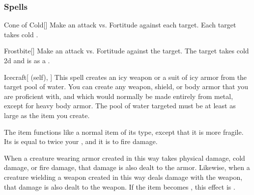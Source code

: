 \subsubsection{Spells}


\lowercase{\hypertarget{spell:Cone of Cold}{}}\label{spell:Cone of Cold}
\begin{freeability}[\nth{1}]{\hypertarget{spell:Cone of Cold}{Cone of Cold}}[]
Make an attack vs. Fortitude against each target.
\hit Each target takes cold .
\end{freeability}
\vspace{0.25em}



\lowercase{\hypertarget{spell:Frostbite}{}}\label{spell:Frostbite}
\begin{freeability}[\nth{1}]{\hypertarget{spell:Frostbite}{Frostbite}}[]
Make an attack vs. Fortitude against the target.
\hit The target takes cold  \minus2d and is  as a .
\end{freeability}
\vspace{0.25em}



\lowercase{\hypertarget{spell:Icecraft}{}}\label{spell:Icecraft}
\begin{attuneability}[\nth{1}]{\hypertarget{spell:Icecraft}{Icecraft}}[ (self), ]
This spell creates an icy weapon or a suit of icy armor from the target pool of water.
You can create any weapon, shield, or body armor that you are proficient with, and which would normally be made entirely from metal, except for heavy body armor.
The pool of water targeted must be at least as large as the item you create.

The item functions like a normal item of its type, except that it is more fragile.
Its  is equal to twice your , and it is  to fire damage.

When a creature wearing armor created in this way takes physical damage, cold damage, or fire damage, that damage is also dealt to the armor.
Likewise, when a creature wielding a weapon created in this way deals damage with the weapon, that damage is also dealt to the weapon.
If the item becomes , this effect is .
\end{attuneability}
\vspace{0.25em}



